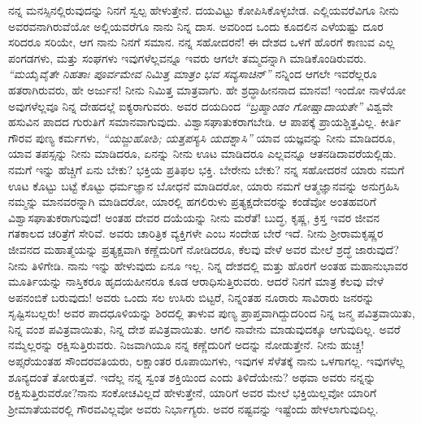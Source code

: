 ನನ್ನ ಮನಸ್ಸಿನಲ್ಲಿರುವುದನ್ನು ನಿನಗೆ ಸ್ವಲ್ಪ ಹೇಳುತ್ತೇನೆ. ದಯವಿಟ್ಟು ಕೋಪಿಸಿಕೊಳ್ಳಬೇಡ. ಎಲ್ಲಿಯವರೆವಿಗೂ ನೀನು ಅವರವನಾಗಿರುವೆಯೋ ಅಲ್ಲಿಯವರೆಗೂ ನಾನು ನಿನ್ನ ದಾಸ. ಅವರಿಂದ ಒಂದು ಕೂದಲಿನ ಎಳೆಯಷ್ಟು ದೂರ ಸರಿದರೂ ಸರಿಯೇ, ಆಗ ನಾನು ನಿನಗೆ ಸಮಾನ. ನನ್ನ ಸಹೋದರನೆ! ಈ ದೇಶದ ಒಳಗೆ ಹೊರಗೆ ಕಾಣುವ ಎಲ್ಲ ಪಂಗಡಗಳು, ಮತ್ತು ಸಂಘಗಳು ಇವುಗಳೆಲ್ಲವನ್ನೂ ಇವರು ಆಗಲೇ ತಮ್ಮದನ್ನಾಗಿ ಮಾಡಿಕೊಂಡಿರುವರು. \textit{ “ಮಯೈವೈತೇ ನಿಹತಾಃ ಪೂರ್ವಮೇವ ನಿಮಿತ್ತ ಮಾತ್ರಂ ಭವ ಸವ್ಯಸಾಚಿನ್” }\enginline{-} ನನ್ನಿಂದ ಆಗಲೇ ಇವರೆಲ್ಲರೂ ಹತರಾಗಿರುವರು, ಹೇ ಅರ್ಜುನ! ನೀನು ನಿಮಿತ್ತ ಮಾತ್ರವಾಗು. ಹೇ ಶ್ರದ್ಧಾಹೀನನಾದ ಮಾನವ! ಇಂದೋ ನಾಳೆಯೋ ಅವುಗಳೆಲ್ಲವೂ ನಿನ್ನ ದೇಹದಲ್ಲೆ ಐಕ್ಯರಾಗುವರು. ಅವರ ದಯದಿಂದ \textit{ “ಬ್ರಹ್ಮಾಂಡಂ ಗೋಷ್ಷಾದಾಯತೇ” } \enginline{-} ವಿಶ್ವವೇ ಹಸುವಿನ ಪಾದದ ಗುರುತಿಗೆ ಸಮಾನವಾಗುವುದು. ವಿಶ್ವಾಸಘಾತುಕರಾಗಬೇಡಿ. ಆ ಪಾಪಕ್ಕೆ ಪ್ರಾಯಶ್ಚಿತ್ತವಿಲ್ಲ. ಕೀರ್ತಿ ಗೌರವ ಪುಣ್ಯ ಕರ್ಮಗಳು, \textit{ “ಯಜ್ಜುಹೋಶಿ; ಯತ್ತಪಸ್ಯಸಿ ಯದಶ್ನಾಸಿ” }ಯಾವ ಯಜ್ಞವನ್ನು ನೀನು ಮಾಡಿದರೂ, ಯಾವ ತಪಸ್ಸನ್ನು ನೀನು ಮಾಡಿದರೂ, ಏನನ್ನು ನೀನು ಊಟ ಮಾಡಿದರೂ ಎಲ್ಲವನ್ನೂ ಆತನಡಿದಾವರೆಯಲ್ಲಿಡು. ನಮಗೆ ಇನ್ನು ಹೆಚ್ಚಿಗೆ ಏನು ಬೇಕು? ಭಕ್ತಿಯ ಪ್ರತಿಫಲ ಭಕ್ತಿ. ಬೇರೇನು ಬೇಕು? ನನ್ನ ಸಹೋದರನೆ ಯಾರು ನಮಗೆ ಊಟ ಕೊಟ್ಟು ಬಟ್ಟೆ ಕೊಟ್ಟು ಧರ್ಮಜ್ಞಾನ ಬೋಧನೆ ಮಾಡಿದರೋ, ಯಾರು ನಮಗೆ ಆತ್ಮಜ್ಞಾನವನ್ನು ಅನುಗ್ರಹಿಸಿ ನಮ್ಮನ್ನು ಮಾನವರನ್ನಾಗಿ ಮಾಡಿದರೋ, ಯಾರಲ್ಲಿ ಹಗಲಿರುಳು ಪ್ರತ್ಯಕ್ಷದೇವರನ್ನು ಕಂಡೆವೋ ಅಂತಹವರಿಗೆ ವಿಶ್ವಾಸಘಾತುಕರಾಗುವುದೆ! ಅಂತಹ ದೇವರ ದಯೆಯನ್ನು ನೀನು ಮರೆತೆ! ಬುದ್ಧ, ಕೃಷ್ಣ, ಕ್ರಿಸ್ತ ಇವರ ಜೀವನ ಗತಕಾಲದ ಚರಿತ್ರೆಗೆ ಸೇರಿವೆ. ಅವರು ಚಾರಿತ್ರಿಕ ವ್ಯಕ್ತಿಗಳೇ ಎಂಬ ಸಂದೇಹ ಬೇರೆ ಇದೆ. ನೀನು ಶ‍್ರೀರಾಮಕೃಷ್ಣರ ಜೀವನದ ಮಹಾತ್ಮೆಯನ್ನು ಪ್ರತ್ಯಕ್ಷವಾಗಿ ಕಣ್ಣೆದುರಿಗೆ ನೋಡಿದರೂ, ಕೆಲವು ವೇಳೆ ಅವರ ಮೇಲೆ ಶ್ರದ್ಧೆ ಜಾರುವುದೆ? ನೀನು ತಿಳಿಗೇಡಿ. ನಾನು ಇನ್ನು ಹೇಳುವುದು ಏನೂ ಇಲ್ಲ. ನಿನ್ನ ದೇಶದಲ್ಲಿ ಮತ್ತು ಹೊರಗೆ ಅಂತಹ ಮಹಾನುಭಾವರ ಮೂರ್ತಿಯನ್ನು ನಾಸ್ತಿಕರೂ ಹೃದಯಹೀನರೂ ಕೂಡ ಆರಾಧಿಸುತ್ತಿರುವರು. ಆದರೆ ನಿನಗೆ ಮಾತ್ರ ಕೆಲವು ವೇಳೆ ಅಪನಂಬಿಕೆ ಬರುವುದು! ಅವರು ಒಂದು ಸಲ ಉಸಿರು ಬಿಟ್ಟರೆ, ನಿನ್ನಂತಹ ನೂರಾರು ಸಾವಿರಾರು ಜನರನ್ನು ಸೃಷ್ಟಿಸಬಲ್ಲರು! ಅವರ ಪಾದಧೂಳಿಯನ್ನು ಶಿರದಲ್ಲಿ ತಾಳುವ ಪುಣ್ಯ ಪ್ರಾಪ್ತವಾಗಿದ್ದುದರಿಂದ ನಿನ್ನ ಜನ್ಮ ಪವಿತ್ರವಾಯಿತು, ನಿನ್ನ ವಂಶ ಪವಿತ್ರವಾಯಿತು, ನಿನ್ನ ದೇಶ ಪವಿತ್ರವಾಯಿತು. ಆಗಲಿ ನಾವೇನು ಮಾಡುವುದಕ್ಕೂ ಆಗುವುದಿಲ್ಲ. ಅವರೆ ನಮ್ಮೆಲ್ಲರನ್ನು ರಕ್ಷಿಸುತ್ತಿರುವರು. ನಿಜವಾಗಿಯೂ ನನ್ನ ಕಣ್ಣೆದುರಿಗೆ ಅದನ್ನು ನೋಡುತ್ತೇನೆ. ನೀನು ಹುಚ್ಚ! ಅಪ್ಸರೆಯಂತಹ ಸೌಂದರವತಿಯರು, ಲಕ್ಷಾಂತರ ರೂಪಾಯಿಗಳು, ಇವುಗಳ ಸೆಳೆತಕ್ಕೆ ನಾನು ಒಳಗಾಗಲ್ಲ. ಇವುಗಳೆಲ್ಲ ಶೂನ್ಯದಂತೆ ತೋರುತ್ತವೆ. ಇದೆಲ್ಲ ನನ್ನ ಸ್ವಂತ ಶಕ್ತಿಯಿಂದ ಎಂದು ತಿಳಿದೆಯೇನು? ಅಥವಾ ಅವರು ನನ್ನನ್ನು ರಕ್ಷಿಸುತ್ತಿರುವರೋ?ನಾನು ಸಂಕೋಚವಿಲ್ಲದೆ ಹೇಳುತ್ತೇನೆ, ಯಾರಿಗೆ ಅವರ ಮೇಲೆ ಭಕ್ತಿಯಿಲ್ಲವೋ ಯಾರಿಗೆ ಶ‍್ರೀಮಾತೆಯವರಲ್ಲಿ ಗೌರವವಿಲ್ಲವೋ ಅವರು ನಿರ್ಭಾಗ್ಯರು. ಅವರ ನಷ್ಟವನ್ನು ಇಷ್ಟೆಂದು ಹೇಳಲಾಗುವುದಿಲ್ಲ.

